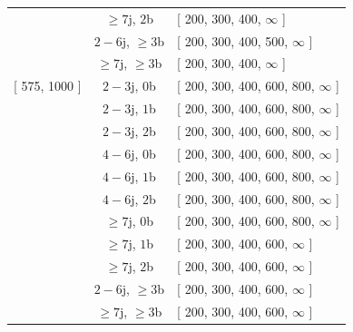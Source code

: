 \begin{table}[htbp]
\begin{tabular}{ccl}
 & $\geq7$j, $  2$b  &  [ 200, 300, 400,  $\infty$  ] \\

 & $2-6$j, $  \geq3$b  &  [ 200, 300, 400, 500,  $\infty$  ] \\

 & $\geq7$j, $  \geq3$b  &  [ 200, 300, 400,  $\infty$  ] \\ \hline

[ 575, 1000 ] & $2-3$j, $  0$b  &  [ 200, 300, 400, 600, 800,  $\infty$  ] \\

 & $2-3$j, $  1$b  &  [ 200, 300, 400, 600, 800,  $\infty$  ] \\

 & $2-3$j, $  2$b  &  [ 200, 300, 400, 600, 800,  $\infty$  ] \\

 & $4-6$j, $  0$b  &  [ 200, 300, 400, 600, 800,  $\infty$  ] \\

 & $4-6$j, $  1$b  &  [ 200, 300, 400, 600, 800,  $\infty$  ] \\

 & $4-6$j, $  2$b  &  [ 200, 300, 400, 600, 800,  $\infty$  ] \\

 & $\geq7$j, $  0$b  &  [ 200, 300, 400, 600, 800,  $\infty$  ] \\

 & $\geq7$j, $  1$b  &  [ 200, 300, 400, 600,  $\infty$  ] \\

 & $\geq7$j, $  2$b  &  [ 200, 300, 400, 600,  $\infty$  ] \\

 & $2-6$j, $  \geq3$b  &  [ 200, 300, 400, 600,  $\infty$  ] \\

 & $\geq7$j, $  \geq3$b  &  [ 200, 300, 400, 600,  $\infty$  ] \\ \hline
 
	 \end{tabular}
	\label{tbl:mt2bins1}
\end{table}

